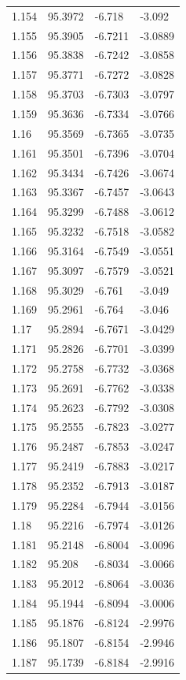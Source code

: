 \begin{tabular}{llll}
1.154 & 95.3972 & -6.718 & -3.092 \\
1.155 & 95.3905 & -6.7211 & -3.0889 \\
1.156 & 95.3838 & -6.7242 & -3.0858 \\
1.157 & 95.3771 & -6.7272 & -3.0828 \\
1.158 & 95.3703 & -6.7303 & -3.0797 \\
1.159 & 95.3636 & -6.7334 & -3.0766 \\
1.16 & 95.3569 & -6.7365 & -3.0735 \\
1.161 & 95.3501 & -6.7396 & -3.0704 \\
1.162 & 95.3434 & -6.7426 & -3.0674 \\
1.163 & 95.3367 & -6.7457 & -3.0643 \\
1.164 & 95.3299 & -6.7488 & -3.0612 \\
1.165 & 95.3232 & -6.7518 & -3.0582 \\
1.166 & 95.3164 & -6.7549 & -3.0551 \\
1.167 & 95.3097 & -6.7579 & -3.0521 \\
1.168 & 95.3029 & -6.761 & -3.049 \\
1.169 & 95.2961 & -6.764 & -3.046 \\
1.17 & 95.2894 & -6.7671 & -3.0429 \\
1.171 & 95.2826 & -6.7701 & -3.0399 \\
1.172 & 95.2758 & -6.7732 & -3.0368 \\
1.173 & 95.2691 & -6.7762 & -3.0338 \\
1.174 & 95.2623 & -6.7792 & -3.0308 \\
1.175 & 95.2555 & -6.7823 & -3.0277 \\
1.176 & 95.2487 & -6.7853 & -3.0247 \\
1.177 & 95.2419 & -6.7883 & -3.0217 \\
1.178 & 95.2352 & -6.7913 & -3.0187 \\
1.179 & 95.2284 & -6.7944 & -3.0156 \\
1.18 & 95.2216 & -6.7974 & -3.0126 \\
1.181 & 95.2148 & -6.8004 & -3.0096 \\
1.182 & 95.208 & -6.8034 & -3.0066 \\
1.183 & 95.2012 & -6.8064 & -3.0036 \\
1.184 & 95.1944 & -6.8094 & -3.0006 \\
1.185 & 95.1876 & -6.8124 & -2.9976 \\
1.186 & 95.1807 & -6.8154 & -2.9946 \\
1.187 & 95.1739 & -6.8184 & -2.9916 \\

\end{tabular}
